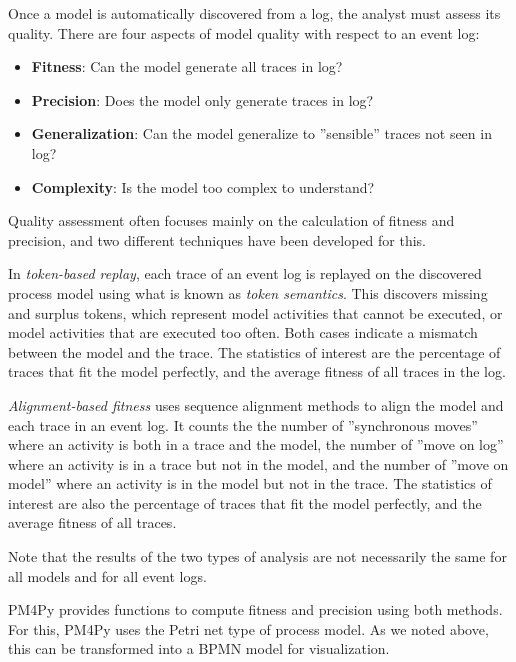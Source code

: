 Once a model is automatically discovered from a log, the analyst must assess its quality. There are four aspects of model quality with respect to an event log:

\begin{itemize}
   \item \textbf{Fitness}: Can the model generate all traces in log?
   \item \textbf{Precision}: Does the model only generate traces in log?
   \item \textbf{Generalization}: Can the model generalize to ''sensible'' traces not seen in log?
   \item \textbf{Complexity}: Is the model too complex to understand?
\end{itemize}

Quality assessment often focuses mainly on the calculation of fitness and precision, and two different techniques have been developed for this.

In \emph{token-based replay}, each trace of an event log is replayed on the discovered process model using what is known as \emph{token semantics}. This discovers missing and surplus tokens, which represent model activities that cannot be executed, or model activities that are executed too often. Both cases indicate a mismatch between the model and the trace. The statistics of interest are the percentage of traces that fit the model perfectly, and the average fitness of all traces in the log.

\emph{Alignment-based fitness} uses sequence alignment methods to align the model and each trace in an event log. It counts the the number of ''synchronous moves'' where an activity is both in a trace and the model, the number of ''move on log'' where an activity is in a trace but not in the model, and the number of ''move on model'' where an activity is in the model but not in the trace. The statistics of interest are also the percentage of traces that fit the model perfectly, and the average fitness of all traces.

Note that the results of the two types of analysis are not necessarily the same for all models and for all event logs.

PM4Py provides functions to compute fitness and precision using both methods. For this, PM4Py uses the Petri net type of process model. As we noted above, this can be transformed into a BPMN model for visualization. 

